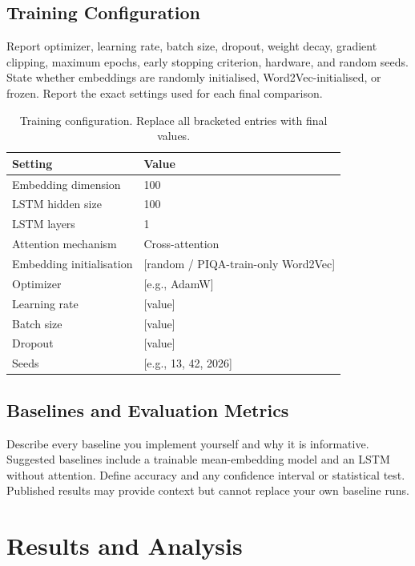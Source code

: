 \documentclass[11pt]{article}
\begin{document}
\subsection{Training Configuration}

Report optimizer, learning rate, batch size, dropout, weight decay, gradient clipping, maximum epochs, early stopping criterion, hardware, and random seeds. State whether embeddings are randomly initialised, Word2Vec-initialised, or frozen. Report the exact settings used for each final comparison.

\begin{table}[t]
\centering
\small
\caption{Training configuration. Replace all bracketed entries with final values.}
\label{tab:training}
\begin{tabular}{@{}ll@{}}
\toprule
Setting & Value \\
\midrule
Embedding dimension & 100 \\
LSTM hidden size & 100 \\
LSTM layers & 1 \\
Attention mechanism & Cross-attention \\
Embedding initialisation & [random / PIQA-train-only Word2Vec] \\
Optimizer & [e.g., AdamW] \\
Learning rate & [value] \\
Batch size & [value] \\
Dropout & [value] \\
Seeds & [e.g., 13, 42, 2026] \\
\bottomrule
\end{tabular}
\end{table}

\subsection{Baselines and Evaluation Metrics}

Describe every baseline you implement yourself and why it is informative. Suggested baselines include a trainable mean-embedding model and an LSTM without attention. Define accuracy and any confidence interval or statistical test. Published results may provide context but cannot replace your own baseline runs.

\section{Results and Analysis}
\end{document}
